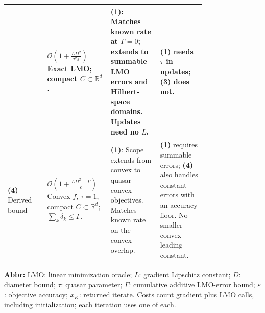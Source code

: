 \begin{table}[tp]
\begin{threeparttable}
\begin{tabularx}{\linewidth}{@{}>{\raggedright\arraybackslash}p{0.20\linewidth}>{\raggedright\arraybackslash}p{0.32\linewidth}>{\raggedright\arraybackslash}p{0.25\linewidth}>{\raggedright\arraybackslash}X@{}}
& $\mathcal{O}\!\left(1+\frac{LD^2}{\tau^2\varepsilon}\right)$\newline Exact LMO; compact $C\subset\mathbb{R}^d$.
& \textbf{(1)}: Matches known rate at $\Gamma=0$; extends to summable LMO errors and Hilbert-space domains. Updates need no $L$.
& \textbf{(1)} needs $\tau$ in updates; \textbf{(3)} does not. \\
\midrule
\textbf{(4)} Derived bound \citep[Thm.~5.1, Rem.~5.1]{qalmFreundGrigas2016}
& $\mathcal{O}\!\left(1+\frac{LD^2+\Gamma}{\varepsilon}\right)$\newline Convex $f$, $\tau=1$, compact $C\subset\mathbb{R}^d$; $\sum_k\delta_k\le\Gamma$.
& \textbf{(1)}: Scope extends from convex to quasar-convex objectives. Matches known rate on the convex overlap.
& \textbf{(1)} requires summable errors; \textbf{(4)} also handles constant errors with an accuracy floor. No smaller convex leading constant. \\
\bottomrule
\end{tabularx}
\begin{tablenotes}[flushleft]\footnotesize
\item[] \textbf{Abbr:} LMO: linear minimization oracle; $L$: gradient Lipschitz constant; $D$: diameter bound; $\tau$: quasar parameter; $\Gamma$: cumulative additive LMO-error bound; $\varepsilon$: objective accuracy; $x_K$: returned iterate. Costs count gradient plus LMO calls, including initialization; each iteration uses one of each.
\end{tablenotes}
\end{threeparttable}
\end{table}
\clearpage
